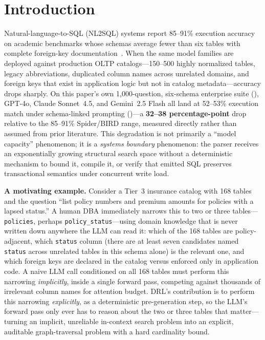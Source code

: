 \documentclass[twocolumn]{svjour3}
\begin{document}

\section{Introduction}
\label{sec:intro}

Natural-language-to-SQL (NL2SQL) systems report 85--91\% execution accuracy on academic benchmarks whose schemas average fewer than six tables with complete foreign-key documentation~\cite{yu2018spider,li2023can}.
When the same model families are deployed against production OLTP catalogs---150--500 highly normalized tables, legacy abbreviations, duplicated column names across unrelated domains, and foreign keys that exist in application logic but not in catalog metadata---accuracy drops sharply.
On this paper's own 1{,}000-question, six-schema enterprise suite (), GPT-4o, Claude Sonnet~4.5, and Gemini~2.5 Flash all land at 52--53\% execution match under schema-linked prompting ()---a \textbf{32--38 percentage-point} drop relative to the 85--91\% Spider/BIRD range, measured directly rather than assumed from prior literature.
This degradation is not primarily a ``model capacity'' phenomenon; it is a \emph{systems boundary} phenomenon: the parser receives an exponentially growing structural search space without a deterministic mechanism to bound it, compile it, or verify that emitted SQL preserves transactional semantics under concurrent write load.

\textbf{A motivating example.}
Consider a Tier~3 insurance catalog with 168 tables and the question ``list policy numbers and premium amounts for policies with a lapsed status.''
A human DBA immediately narrows this to two or three tables---\texttt{policies}, perhaps \texttt{policy\_status}---using domain knowledge that is never written down anywhere the LLM can read it: which of the 168 tables are policy-adjacent, which \texttt{status} column (there are at least seven candidates named \texttt{status} across unrelated tables in this schema alone) is the relevant one, and which foreign keys are declared in the catalog versus enforced only in application code.
A naive LLM call conditioned on all 168 tables must perform this narrowing \emph{implicitly}, inside a single forward pass, competing against thousands of irrelevant column names for attention budget.
DRL's contribution is to perform this narrowing \emph{explicitly}, as a deterministic pre-generation step, so the LLM's forward pass only ever has to reason about the two or three tables that matter---turning an implicit, unreliable in-context search problem into an explicit, auditable graph-traversal problem with a hard cardinality bound.
\end{document}
